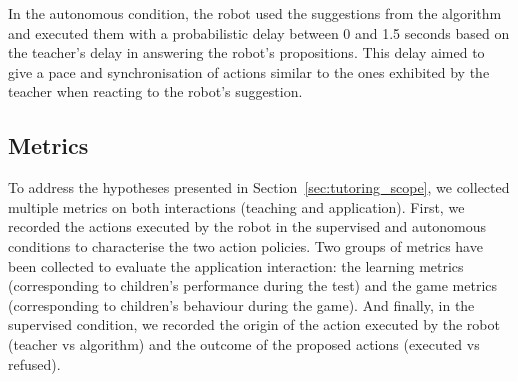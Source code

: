 In the autonomous condition, the robot used the suggestions from the algorithm and executed them with a probabilistic delay between 0 and 1.5 seconds based on the teacher's delay in answering the robot's propositions. This delay aimed to give a pace and synchronisation of actions similar to the ones exhibited by the teacher when reacting to the robot's suggestion.


\subsection{Metrics}


To address the hypotheses presented in Section~\ref{sec:tutoring_scope}, we collected multiple metrics on both interactions (teaching and application). First, we recorded the actions executed by the robot in the supervised and autonomous conditions to characterise the two action policies. Two groups of metrics have been collected to evaluate the application interaction: the learning metrics (corresponding to children's performance during the test) and the game metrics (corresponding to children's behaviour during the game). And finally, in the supervised condition, we recorded the origin of the action executed by the robot (teacher vs algorithm) and the outcome of the proposed actions (executed vs refused).

